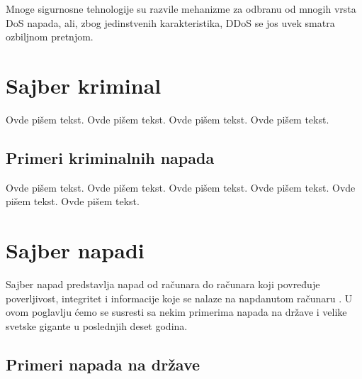 \documentclass[a4paper]{article}
\begin{document}
Mnoge sigurnosne tehnologije su razvile mehanizme za odbranu od mnogih vrsta DoS napada, ali, zbog jedinstvenih karakteristika, DDoS se jos uvek smatra ozbiljnom pretnjom.

\section{Sajber kriminal}
\label{sec:sajber_kriminal}

Ovde pišem tekst. 
Ovde pišem tekst. 
Ovde pišem tekst. 
Ovde pišem tekst. 

\subsection{Primeri kriminalnih napada}
\label{subsec:primeri_krimi_napada}

Ovde pišem tekst. 
Ovde pišem tekst. 
Ovde pišem tekst. 
Ovde pišem tekst. 
Ovde pišem tekst. 
Ovde pišem tekst. 

\section{Sajber napadi}
\label{sec:sajber_napadi}

Sajber napad predstavlja napad od računara do računara koji povređuje poverljivost, integritet i informacije koje se nalaze na napdanutom računaru \cite{knjiga}. U ovom poglavlju ćemo se susresti sa nekim primerima napada na države i velike svetske gigante u poslednjih deset godina. 

\subsection{Primeri napada na države}
\label{subsec:primeri_napada_drzave}
\end{document}
